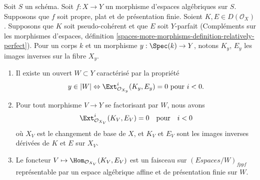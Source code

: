 \begin{lemma}
\label{lemma-complexes-open-neg-exts-vanishing}
Soit $S$ un schéma.
Soit $f : X \to Y$ un morphisme d'espaces algébriques sur $S$.
Supposons que $f$ soit propre, plat et de présentation finie.
Soient $K, E \in D(\mathcal{O}_X)$. Supposons que $K$ soit pseudo-cohérent et
que $E$ soit $Y$-parfait (Compléments sur les morphismes d'espaces, définition
\ref{spaces-more-morphisms-definition-relatively-perfect}).
Pour un corps $k$ et un morphisme $y : \Spec(k) \to Y$, notons $K_y$, $E_y$
les images inverses sur la fibre $X_y$.
\begin{enumerate}
\item Il existe un ouvert $W \subset Y$ caractérisé par la propriété
$$
y \in |W|
\Leftrightarrow
\Ext^i_{\mathcal{O}_{X_y}}(K_y, E_y) = 0
\text{ pour }i < 0.
$$
\item Pour tout morphisme $V \to Y$ se factorisant par $W$, nous avons
$$
\Ext^i_{\mathcal{O}_{X_V}}(K_V, E_V) = 0
\quad\text{pour}\quad i < 0
$$
où $X_V$ est le changement de base de $X$, et $K_V$ et $E_V$ sont les images
inverses dérivées de $K$ et $E$ sur $X_V$.
\item Le foncteur $V \mapsto \Hom_{\mathcal{O}_{X_V}}(K_V, E_V)$
est un faisceau sur $(\textit{Espaces}/W)_{fppf}$ représentable par un espace
algébrique affine et de présentation finie sur $W$.
\end{enumerate}
\end{lemma}


